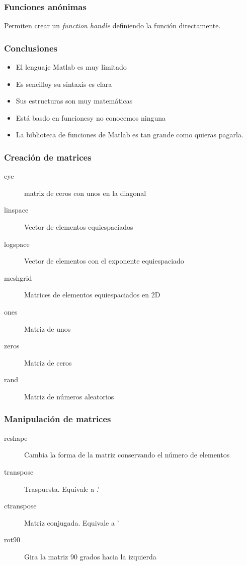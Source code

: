 \documentclass[12pt]{beamer}
\begin{document}
\begin{large}

\begin{frame}
\frametitle{Funciones anónimas} 
Permiten crear un \emph{function handle} definiendo la función
directamente.
\testcode
\end{frame}

\begin{frame}
\frametitle{Conclusiones}
\begin{itemize}
\item El lenguaje Matlab es muy limitado
\item Es sencilloy su sintaxis es clara
\item Sus estructuras son muy matemáticas
\item Está basdo en funcionesy no conocemos ninguna
\item La biblioteca de funciones de Matlab es tan grande como quieras
  pagarla.
\end{itemize}
\end{frame}

\begin{frame}
\frametitle{Creación de matrices}
\begin{description}
\item[eye] matriz de ceros con unos en la diagonal
\item[linspace] Vector de elementos equiespaciados
\item[logspace] Vector de elementos con el exponente equiespaciado
\item[meshgrid] Matrices de elementos equiespaciados en 2D
\item[ones] Matriz de unos
\item[zeros] Matriz de ceros
\item[rand] Matriz de números aleatorios
\end{description}
\end{frame}

\begin{frame}
\frametitle{Manipulación de matrices}
\begin{description}
\item[reshape] Cambia la forma de la matriz conservando el número de
  elementos
\item[transpose] Traspuesta. Equivale a .'
\item[ctranspose] Matriz conjugada. Equivale a '
\item[rot90] Gira la matriz 90 grados hacia la izquierda
\end{description}
\end{frame}


\end{large}
\end{document}
